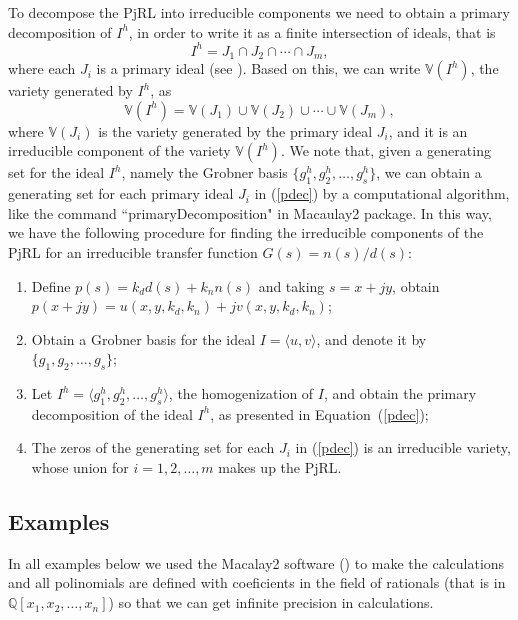 \documentclass{article}
\begin{document}
To decompose the PjRL into irreducible components we need to obtain 
a primary decomposition of $I^h$, in order to write it  as a
finite intersection of ideals, that is
\begin{equation}\label{pdec}
I^h = J_1 \cap J_2 \cap \cdots \cap  J_m,
\end{equation}
where each $J_i$ is a primary ideal (see \cite[Thm. 7.13]{am}).
Based on this, we can write $\mathbb V(I^h) $, the variety generated
by $I^h $, as 
\[
\mathbb V(I^h) = \mathbb V(J_1) \cup \mathbb V(J_2) \cup \cdots \cup \mathbb V(J_m),
\]
where $\mathbb V(J_i)$ is the variety generated by the primary ideal $J_i $, and it is
an irreducible component of the variety $\mathbb V (I^h) $. We note that, given a generating set for the
ideal $I^h $, namely the Grobner basis $\{g_{1}^{h}, g_{2}^{h}, \ldots, g_{s}^{h}\} $, we can 
obtain a generating set for each primary ideal $J_i $ in (\ref{pdec}) by a computational algorithm,
like the command ``primaryDecomposition" in Macaulay2 package. In this way, we have the
following procedure for finding the irreducible components of the PjRL for an irreducible 
transfer function $G (s)=n (s)/d (s) $:
\begin{enumerate}
\item Define $p(s) = k_dd(s) + k_nn(s) $ and taking $s = x + jy $, obtain $p(x+jy) = u(x,y,k_d,k_n) + jv (x,y,k_d,k_n) $;
\item Obtain a Grobner basis for the ideal $I=\langle u, v\rangle $, and denote it by $\{g_1, g_2, \ldots, g_s\} $;
\item Let $I^h = \langle g_{1}^{h}, g_{2}^{h}, \ldots, g_{s}^{h}\rangle $, the homogenization of $I$, and obtain the 
primary decomposition of the ideal $ I^h $, as presented in Equation~(\ref{pdec});
\item The zeros of the generating set for each $J_i $ in (\ref{pdec}) is an irreducible variety, 
whose union for $i = 1, 2, \ldots, m $ makes up the PjRL.

\end{enumerate}

\subsection{Examples}


In all examples below we used the Macalay2 software (\cite{mac}) to make the calculations 
and all polinomials are defined with coeficients in the field of rationals (that is in 
$\mathbb Q[x_1,x_2,\ldots,x_n]$) so that we can get infinite precision in calculations.
\end{document}
